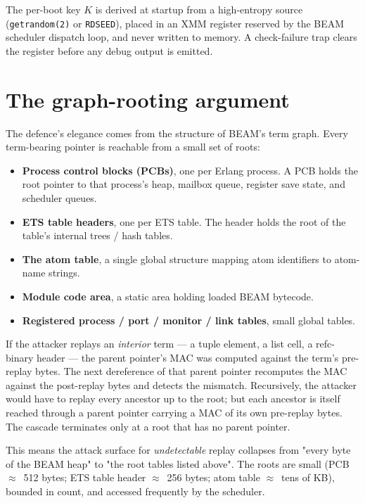 \documentclass[10pt,a4paper]{article}
\begin{document}
The per-boot key $K$ is derived at startup from a high-entropy source
(\texttt{getrandom(2)} or \texttt{RDSEED}), placed in an XMM register
reserved by the BEAM scheduler dispatch loop, and never written to
memory. A check-failure trap clears the register before any debug
output is emitted.

\section{The graph-rooting argument}

The defence's elegance comes from the structure of BEAM's term graph.
Every term-bearing pointer is reachable from a small set of roots:

\begin{itemize}[label=---]
\item \textbf{Process control blocks (PCBs)}, one per Erlang process.
A PCB holds the root pointer to that process's heap, mailbox queue,
register save state, and scheduler queues.
\item \textbf{ETS table headers}, one per ETS table. The header holds
the root of the table's internal trees / hash tables.
\item \textbf{The atom table}, a single global structure mapping atom
identifiers to atom-name strings.
\item \textbf{Module code area}, a static area holding loaded BEAM
bytecode.
\item \textbf{Registered process / port / monitor / link tables},
small global tables.
\end{itemize}

If the attacker replays an \emph{interior} term --- a tuple element, a
list cell, a refc-binary header --- the parent pointer's MAC was
computed against the term's pre-replay bytes. The next dereference of
that parent pointer recomputes the MAC against the post-replay bytes
and detects the mismatch. Recursively, the attacker would have to
replay every ancestor up to the root; but each ancestor is itself
reached through a parent pointer carrying a MAC of its own pre-replay
bytes. The cascade terminates only at a root that has no parent
pointer.

This means the attack surface for \emph{undetectable} replay collapses
from "every byte of the BEAM heap" to "the root tables listed above".
The roots are small (PCB $\approx$~512 bytes; ETS table header
$\approx$~256 bytes; atom table $\approx$~tens of KB), bounded in count,
and accessed frequently by the scheduler.
\end{document}

